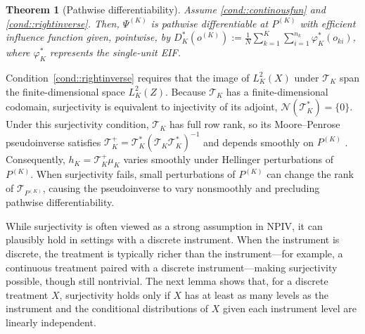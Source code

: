 \documentclass[11pt]{article}
\theoremstyle{plain}
\newtheorem{theorem}{Theorem}
\theoremstyle{definition}
\theoremstyle{remark}
\theoremstyle{definition}
\begin{document}
\begin{theorem}[Pathwise differentiability]
\label{theorem::EIF}
Assume \ref{cond::continousfun} and \ref{cond::rightinverse}. Then, \( \Psi^{(K)} \) is pathwise differentiable  at \( P^{(K)} \)  with efficient influence function given, pointwise, by $ D_K^*(o^{(K)}) := \frac{1}{N} \sum_{k=1}^K \sum_{i=1}^{n_k} \varphi_K^*(o_{ki})$, where $\varphi_K^*$ represents the single-unit EIF.
\end{theorem}
Condition~\ref{cond::rightinverse} requires that the image of \(L^2_K(X)\) under
\(\mathcal{T}_K\) span the finite-dimensional space \(L^2_K(Z)\). Because
\(\mathcal{T}_K\) has a finite-dimensional codomain, surjectivity is equivalent
to injectivity of its adjoint, \(\mathcal{N}(\mathcal{T}_K^{*}) = \{0\}\). Under
this surjectivity condition, \(\mathcal{T}_K\) has full row rank, so its
Moore--Penrose pseudoinverse satisfies
\(\mathcal{T}_K^{+} = \mathcal{T}_K^{*}(\mathcal{T}_K \mathcal{T}_K^{*})^{-1}\)
and depends smoothly on \(P^{(K)}\) \citep{stewart1977perturbation}. Consequently,
\(h_K = \mathcal{T}_K^{+}\mu_K\) varies smoothly under Hellinger perturbations of
\(P^{(K)}\). When
surjectivity fails, small perturbations of \(P^{(K)}\) can change the rank of
\(\mathcal{T}_{P^{(K)}}\), causing the pseudoinverse to vary nonsmoothly
\citep{ben2003generalized} and precluding pathwise differentiability.



 

While surjectivity is often viewed as a strong assumption in NPIV, it can
plausibly hold in settings with a discrete instrument. When the instrument is
discrete, the treatment is typically richer than the instrument---for example, a
continuous treatment paired with a discrete instrument---making surjectivity
possible, though still nontrivial. The next lemma shows that, for a discrete
treatment \(X\), surjectivity holds only if \(X\) has at least as many levels as
the instrument and the conditional distributions of \(X\) given each instrument
level are linearly independent.
\end{document}
